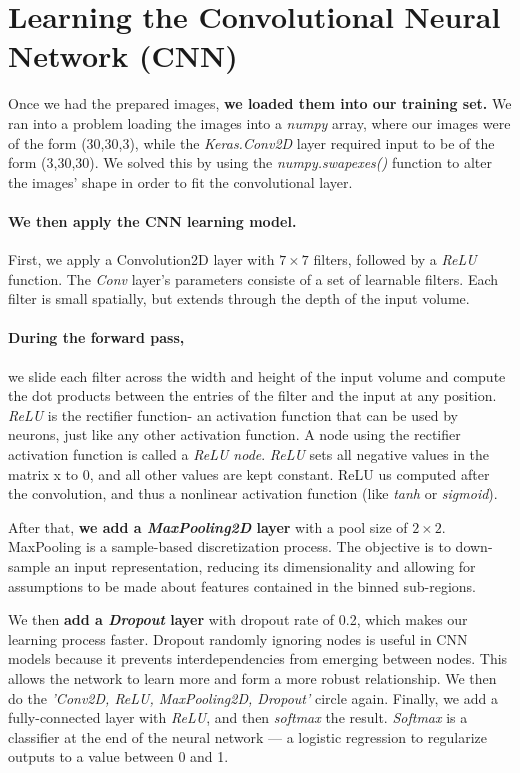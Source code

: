 \documentclass{article}
\begin{document}
\section{Learning the Convolutional Neural Network (CNN)}
Once we had the prepared images, \textbf{we loaded them into our training set.} We ran 
into a problem loading the images into a \textit{numpy} array, where our images were of 
the form (30,30,3), while the \textit{Keras.Conv2D} layer required input to be of the form 
(3,30,30). We solved this by using the \textit{numpy.swapexes()} function to alter the 
images' shape in order to fit the convolutional layer.

\paragraph{We then apply the CNN learning model.}
First, we apply a Convolution2D layer with $7\times7$ filters, followed by a \textit{ReLU} 
function. The \textit{Conv} layer's parameters consiste of a set of learnable filters. 
Each filter is small spatially, but extends through the depth of the input volume. 

\paragraph{During the forward pass,} 
we slide each filter across the width and height of the input 
volume and compute the dot products between the entries of the filter and the input at 
any position. \textit{ReLU} is the rectifier function- an activation function that can be 
used by neurons, just like any other activation function. A node using the rectifier 
activation function is called a \textit{ReLU node}. \textit{ReLU} sets all negative values 
in the matrix x to 0, and all other values are kept constant. ReLU us computed after the 
convolution, and thus a nonlinear activation function (like \textit{tanh} or 
\textit{sigmoid}).

After that, \textbf{we add a \textit{MaxPooling2D} layer} with a pool size of $2\times2$. 
MaxPooling is a sample-based discretization process. The objective is to down-sample an 
input representation, reducing its dimensionality and allowing for assumptions to be made 
about features contained in the binned sub-regions. 

We then \textbf{add a \textit{Dropout} layer} with dropout rate of 0.2, which makes our 
learning process faster. Dropout randomly ignoring nodes is useful in CNN models because 
it prevents interdependencies from emerging between nodes. This allows the network to learn 
more and form a more robust relationship. We then do the \textit{'Conv2D, ReLU, 
MaxPooling2D, Dropout'} circle again. Finally, we add a fully-connected layer with 
\textit{ReLU}, and then \textit{softmax} the result. \textit{Softmax} is a classifier at 
the end of the neural network — a logistic regression to regularize outputs to a value 
between 0 and 1. 
\end{document}
